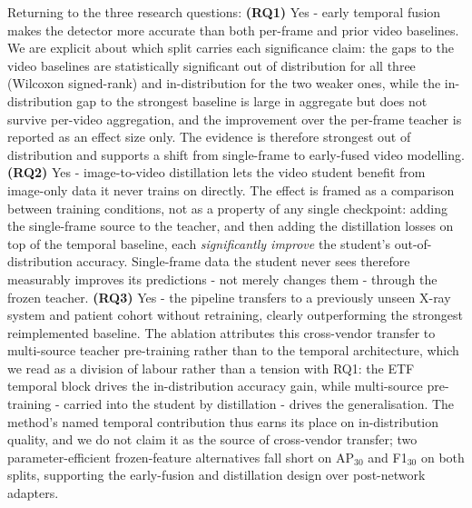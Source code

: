 \documentclass[conference]{IEEEtran}
\begin{document}
Returning to the three research questions: \textbf{(RQ1)} Yes - early temporal fusion makes the detector more accurate than both per-frame and prior video baselines. We are explicit about which split carries each significance claim: the gaps to the video baselines are statistically significant out of distribution for all three (Wilcoxon signed-rank) and in-distribution for the two weaker ones, while the in-distribution gap to the strongest baseline is large in aggregate but does not survive per-video aggregation, and the improvement over the per-frame teacher is reported as an effect size only. The evidence is therefore strongest out of distribution and supports a shift from single-frame to early-fused video modelling. \textbf{(RQ2)} Yes - image-to-video distillation lets the video student benefit from image-only data it never trains on directly. The effect is framed as a comparison between training conditions, not as a property of any single checkpoint: adding the single-frame source to the teacher, and then adding the distillation losses on top of the temporal baseline, each \emph{significantly improve} the student's out-of-distribution accuracy. Single-frame data the student never sees therefore measurably improves its predictions - not merely changes them - through the frozen teacher. \textbf{(RQ3)} Yes - the pipeline transfers to a previously unseen X-ray system and patient cohort without retraining, clearly outperforming the strongest reimplemented baseline. The ablation attributes this cross-vendor transfer to multi-source teacher pre-training rather than to the temporal architecture, which we read as a division of labour rather than a tension with RQ1: the ETF temporal block drives the in-distribution accuracy gain, while multi-source pre-training - carried into the student by distillation - drives the generalisation. The method's named temporal contribution thus earns its place on in-distribution quality, and we do not claim it as the source of cross-vendor transfer; two parameter-efficient frozen-feature alternatives fall short on AP$_{30}$ and F1$_{30}$ on both splits, supporting the early-fusion and distillation design over post-network adapters.
\end{document}
